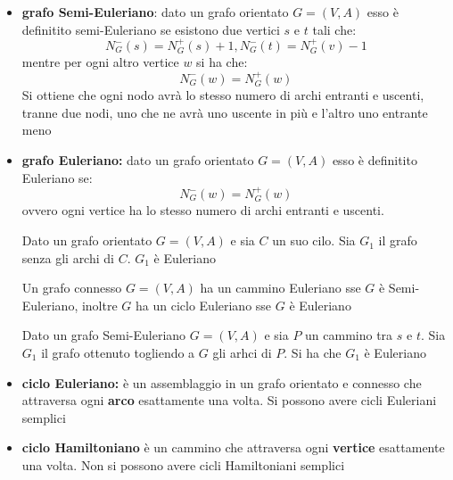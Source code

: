 \documentclass[a4paper,12pt, oneside]{book}
\begin{document}
\begin{definizione}
  \begin{itemize}
    \item \textbf{grafo Semi-Euleriano}: dato un grafo orientato
    $G=(V,A)$ esso è definitito semi-Euleriano se esistono due
    vertici $s$ e $t$ tali che:
    \[N_G^- (s) = N_G^+(s) + 1, N_G^-(t) = N_G^+(v) - 1\]
    mentre per ogni altro vertice $w$ si ha che:
    \[N_G^-(w) = N_G^+(w)\]
    Si ottiene che ogni nodo avrà lo stesso numero di archi entranti
    e uscenti, tranne due nodi, uno che ne avrà uno uscente in più e
    l'altro uno entrante meno
    \item \textbf{grafo Euleriano:} dato un grafo orientato
    $G=(V,A)$ esso è definitito Euleriano se:
    \[N_G^-(w) = N_G^+(w)\]
    ovvero ogni vertice ha lo stesso numero di archi entranti e
    uscenti.
    \begin{teorema}
      Dato un grafo orientato $G=(V,A)$ e sia $C$ un suo cilo. Sia
      $G_1$ il grafo senza gli archi di $C$. $G_1$ è Euleriano
    \end{teorema}
    \begin{teorema}
      Un grafo connesso $G=(V,A)$ ha un cammino Euleriano sse $G$ è
      Semi-Euleriano, inoltre $G$ ha un ciclo Euleriano sse $G$ è Euleriano
    \end{teorema}
    \begin{teorema}
      Dato un grafo Semi-Euleriano $G=(V,A)$ e sia $P$ un cammino
      tra $s$ e $t$. Sia $G_1$ il grafo ottenuto togliendo a $G$ gli
      arhci di $P$. Si ha che $G_1$ è Euleriano
    \end{teorema}
    \item \textbf{ciclo Euleriano:} è un assemblaggio in un grafo
    orientato e connesso che attraversa ogni \textbf{arco} esattamente una
    volta. Si possono avere cicli Euleriani semplici
    \item \textbf{ciclo Hamiltoniano} è un cammino che attraversa
    ogni \textbf{vertice} esattamente una volta. Non si possono
    avere cicli Hamiltoniani semplici
  \end{itemize}
\end{definizione}
\end{document}
